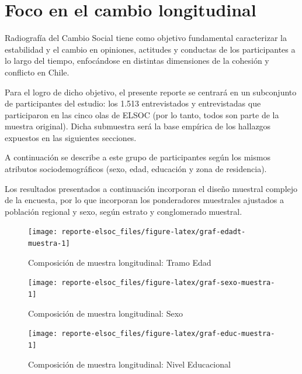 \documentclass[
  12pt,
]{book}
\begin{document}
\hypertarget{foco-en-el-cambio-longitudinal}{%
\section{Foco en el cambio longitudinal}\label{foco-en-el-cambio-longitudinal}}

Radiografía del Cambio Social tiene como objetivo fundamental caracterizar la estabilidad y el cambio en opiniones, actitudes y conductas de los participantes a lo largo del tiempo, enfocándose en distintas dimensiones de la cohesión y conflicto en Chile.

Para el logro de dicho objetivo, el presente reporte se centrará en un subconjunto de participantes del estudio: los 1.513 entrevistados y entrevistadas que participaron en las cinco olas de ELSOC (por lo tanto, todos son parte de la muestra original). Dicha submuestra será la base empírica de los hallazgos expuestos en las siguientes secciones.

A continuación se describe a este grupo de participantes según los mismos atributos sociodemográficos (sexo, edad, educación y zona de residencia).

Los resultados presentados a continuación incorporan el diseño muestral complejo de la encuesta, por lo que incorporan los ponderadores muestrales ajustados a población regional y sexo, según estrato y conglomerado muestral.

\begin{figure}

{\centering \texttt{[image: reporte-elsoc\_files/figure-latex/graf-edadt-muestra-1]} 

}

\caption{Composición de muestra longitudinal: Tramo Edad}\label{fig:graf-edadt-muestra}
\end{figure}

\begin{figure}

{\centering \texttt{[image: reporte-elsoc\_files/figure-latex/graf-sexo-muestra-1]} 

}

\caption{Composición de muestra longitudinal: Sexo}\label{fig:graf-sexo-muestra}
\end{figure}

\begin{figure}

{\centering \texttt{[image: reporte-elsoc\_files/figure-latex/graf-educ-muestra-1]} 

}

\caption{Composición de muestra longitudinal: Nivel Educacional}\label{fig:graf-educ-muestra}
\end{figure}
\end{document}
